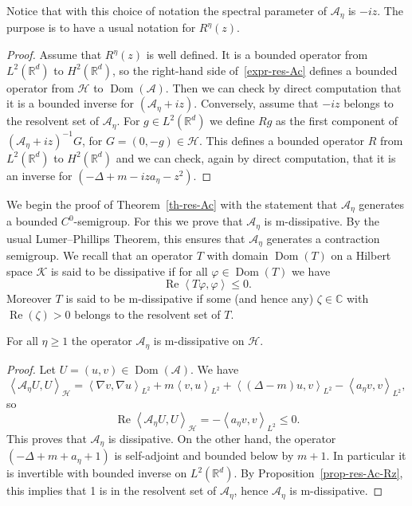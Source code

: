 \documentclass[AHL,Unicode,longabstracts]{cedram}
\newcommand{\innp}[2]{\left< #1, #2 \right>}
\renewcommand{\leq}{\leqslant}
\renewcommand{\geq}{\geqslant}
\newcommand{\inv}{^{-1}}
\newcommand{\1}{\mathds 1}
\DeclareMathOperator{\Reop}{Re}
\DeclareMathOperator{\Dom}{Dom}
\renewcommand{\Re}{\Reop}
\newcommand{\R}{\mathbb{R}}
\newcommand{\D}{\Delta}
\newcommand{\z}{\zeta}
\newcommand{\f}{\varphi}
\newcommand{\Ac}{{\mathcal A}}
\newcommand{\Kc}{{\mathcal K}}
\newcommand{\HH}{\mathcal H}
\begin{document}
Notice that with this choice of notation the spectral parameter of $\Ac_\eta$ is $-iz$. The purpose is to have a usual notation for $R^\eta(z)$.

\begin{proof}
Assume that $R^\eta(z)$ is well defined. It is a bounded operator from $L^2(\R^d)$ to $H^2(\R^d)$, so the right-hand side of~\eqref{expr-res-Ac} defines a bounded operator from $\HH$ to $\Dom(\Ac)$. Then we can check by direct computation that it is a bounded inverse for $(\Ac_\eta + iz)$. Conversely, assume that $-iz$ belongs to the resolvent set of $\Ac_\eta$. For $g \in L^2(\R^d)$ we define $Rg$ as the first component of $(\Ac_\eta + iz)\inv G$, for $G = (0,-g) \in \HH$. This defines a bounded operator $R$ from $L^2(\R^d)$ to $H^2(\R^d)$ and we can check, again by direct computation, that it is an inverse for ${(-\D + m - iza_\eta - z^2)}$.
\end{proof}

We begin the proof of Theorem~\ref{th-res-Ac} with the statement that $\Ac_\eta$ generates a bounded $C^0$-semigroup. For this we prove that $\Ac_\eta$ is \textsf{m}-dissipative. By the usual Lumer--Phillips Theorem, this ensures that $\Ac_\eta$ generates a contraction semigroup. We recall that an operator $T$ with domain $\Dom(T)$ on a Hilbert space $\Kc$ is said to be dissipative if for all $\f \in \Dom(T)$ we have
\[
\Re \innp{T\f}{\f} \leq 0.
\]
Moreover $T$ is said to be \textsf{m}-dissipative if some (and hence any) $\z \in \mathbb C$ with $\Re(\z) > 0$ belongs to the resolvent set of $T$.

\begin{prop}\label{prop-Ac-diss}
For all $\eta \geq 1$ the operator $\Ac_\eta$ is \textsf{m}-dissipative on $\HH$.
\end{prop}

\begin{proof}
Let $U = (u,v) \in \Dom(\Ac)$. We have
\[
\innp{\Ac_\eta U}{U}_\HH = \innp{\nabla v}{\nabla u}_{L^2} + m \innp{v}{u}_{L^2} + \innp{(\D - m) u}{v}_{L^2} - \innp{a_\eta v}{v}_{L^2},
\]
so
\[
\Re \innp{\Ac_\eta U}{U}_\HH = - \innp{a_\eta v}{v}_{L^2} \leq 0.
\]
This proves that $\Ac_\eta$ is dissipative. On the other hand, the operator $(-\D + m + a_\eta + 1)$ is self-adjoint and bounded below by $m+1$. In particular it is invertible with bounded inverse on $L^2(\R^d)$. By Proposition~\ref{prop-res-Ac-Rz}, this implies that 1 is in the resolvent set of $\Ac_\eta$, hence $\Ac_\eta$ is \textsf{m}-dissipative.
\end{proof}
\end{document}
